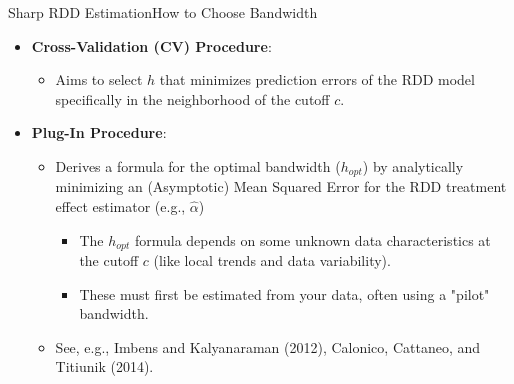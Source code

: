 \documentclass[hyperref={pdfpagelabels=false}]{beamer}
\begin{document}
\begin{frame}{Sharp RDD Estimation}{How to Choose Bandwidth}
	\begin{itemize}
		\item[1.] \textbf{Cross-Validation (CV) Procedure}:
		\vspace{0.2cm}
		\begin{itemize}
			\item Aims to select $h$ that minimizes prediction errors of the RDD model specifically in the neighborhood of the cutoff $c$.
		\end{itemize}
		\vspace{0.3cm} %
		\item[2.] \textbf{Plug-In Procedure}:
		\vspace{0.2cm}
		\begin{itemize}
			\item Derives a formula for the optimal bandwidth ($h_{opt}$) by analytically minimizing an (Asymptotic) Mean Squared Error for the RDD treatment effect estimator (e.g., $\hat{\alpha}$)
			
			\vspace{0.2cm}
			\begin{itemize}
				\item The $h_{opt}$ formula depends on some unknown data characteristics at the cutoff $c$ (like local trends and data variability). 
				\vspace{0.2cm}
				\item These must first be estimated from your data, often using a "pilot" bandwidth.
				\vspace{0.2cm}
			\end{itemize}		
			\item See, e.g., Imbens and Kalyanaraman (2012), Calonico, Cattaneo, and Titiunik (2014).
		\end{itemize}
	\end{itemize}
\end{frame}
\end{document}
